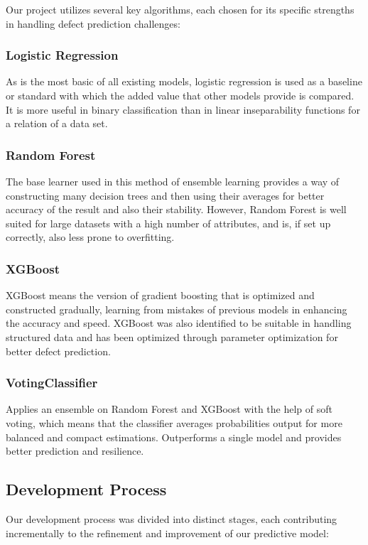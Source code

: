 \documentclass[conference]{IEEEtran}
\begin{document}
Our project utilizes several key algorithms, each chosen for its specific strengths in handling defect prediction challenges: 

\subsubsection{Logistic Regression}
As is the most basic of all existing models, logistic regression is used as a baseline or standard with which the added value that other models provide is compared. It is more useful in binary classification than in linear inseparability functions for a relation of a data set.

\subsubsection{Random Forest}
The base learner used in this method of ensemble learning provides a way of constructing many decision trees and then using their averages for better accuracy of the result and also their stability. However, Random Forest is well suited for large datasets with a high number of attributes, and is, if set up correctly, also less prone to overfitting.

\subsubsection{XGBoost}
XGBoost means the version of gradient boosting that is optimized and constructed gradually, learning from mistakes of previous models in enhancing the accuracy and speed. XGBoost was also identified to be suitable in handling structured data and has been optimized through parameter optimization for better defect prediction.
 
\subsubsection{VotingClassifier}
Applies an ensemble on Random Forest and XGBoost with the help of soft voting, which means that the classifier averages probabilities output for more balanced and compact estimations. Outperforms a single model and provides better prediction and resilience.


\subsection{Development Process}

Our development process was divided into distinct stages, each contributing incrementally to the refinement and improvement of our predictive model: 
\end{document}
